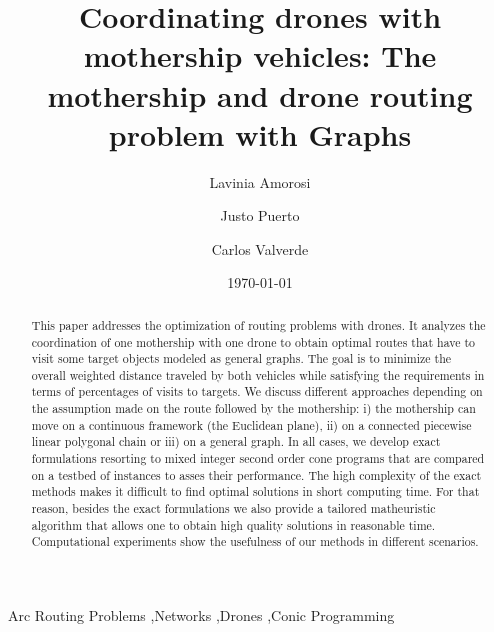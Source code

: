 \documentclass[10pt,a4paper]{elsarticle}
\begin{document}
\begin{frontmatter}

\title{Coordinating drones with mothership vehicles: The mothership and drone routing problem with Graphs}

\author[1]{Lavinia Amorosi}
\author[2]{Justo Puerto}
\author[3]{Carlos Valverde}

\address[1]{Department of Statistics, Sapienza, University of Rome, Rome, 00185, Italy}
\address[2]{Department of Statistics and Operations Research, University of Seville, Seville, 41012, Spain}
\address[3]{Department of Statistics and Operations Research, University of Seville, Seville, 41012, Spain}


\date{\today}

\begin{abstract}
This paper addresses the optimization of routing problems with drones. It analyzes the coordination of one mothership with one drone to obtain optimal routes that have to visit some target objects modeled as general graphs. The goal is to minimize the overall weighted distance traveled by both vehicles while satisfying the requirements in terms of percentages of visits to targets. We discuss different approaches depending on the assumption made on the route followed by the mothership: i) the mothership can move on a continuous framework (the Euclidean plane), ii) on a connected piecewise linear polygonal chain or iii) on a general graph. In all cases, we develop exact formulations resorting to mixed integer second order cone programs that are compared on a testbed of instances to asses their performance. The high complexity of the exact methods makes it difficult to find optimal solutions in short computing time. For that reason, besides the exact formulations we also provide a tailored matheuristic algorithm that allows one to obtain high quality solutions in reasonable time. Computational experiments show the usefulness of our methods in different scenarios. 
\end{abstract}

\begin{keyword}
Arc Routing Problems \sep Networks \sep Drones \sep Conic Programming
\end{keyword}

\end{frontmatter}
\end{document}
